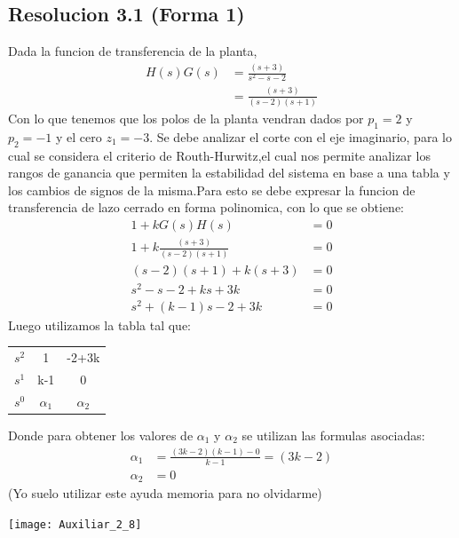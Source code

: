 \documentclass[
  11pt,
  letterpaper,
   addpoints,
  ]{exam}
\begin{document}
\begin{questions}
\begin{solution}
\subsection*{Resolucion 3.1 (Forma 1)}
Dada la funcion de transferencia de la planta,
\begin{align}
    H(s)G(s) &= \frac{(s+3)}{s^{2}-s-2}\\
             &= \frac{(s+3)}{(s-2)(s+1)}
\end{align}
Con lo que tenemos que los polos de la planta vendran dados por $p_{1} = 2$ y $p_{2} = -1$ y el cero $z_{1} = -3$. Se debe analizar el corte con el eje imaginario, para lo cual se considera el criterio de Routh-Hurwitz,el cual nos permite analizar los rangos de ganancia que permiten la estabilidad del sistema en base a una tabla y los cambios de signos de la misma.Para esto se debe expresar la funcion de transferencia de lazo cerrado en forma polinomica, con lo que se obtiene:
\begin{align}
    1+kG(s)H(s) &= 0\\
    1+k\frac{(s+3)}{(s-2)(s+1)} &= 0\\
    (s-2)(s+1)+k(s+3) &= 0\\
    s^{2}-s-2+ks+3k &= 0\\
    s^{2}+(k-1)s-2+3k &= 0
\end{align}
Luego utilizamos la tabla tal que:
\begin{center}
    \begin{tabular}{|c|cc|}
        \hline
        $s^{2}$ & 1 & -2+3k\\
        $s^{1}$ & k-1 & 0\\
        $s^{0}$ & $\alpha_{1}$ & $\alpha_{2}$\\
        \hline
    \end{tabular}
\end{center}
Donde para obtener los valores de $\alpha_{1}$ y $\alpha_{2}$ se utilizan las formulas asociadas:
\begin{align}
    \alpha_{1} &= \frac{(3k-2)(k-1)-0}{k-1} = (3k-2)\\
    \alpha_{2} &= 0
\end{align}
(Yo suelo utilizar este ayuda memoria para no olvidarme)
\begin{center}
    \texttt{[image: Auxiliar\_2\_8]}

\end{center}
\end{solution}
\end{questions}
\end{document}
